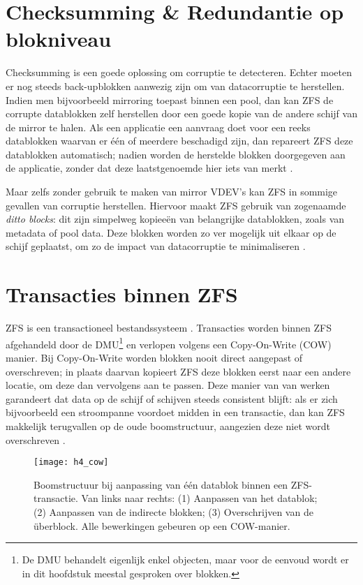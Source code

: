 \section{Checksumming \& Redundantie op blokniveau}

Checksumming is een goede oplossing om corruptie te detecteren. Echter moeten er nog steeds back-upblokken aanwezig zijn om van datacorruptie te herstellen. Indien men bijvoorbeeld mirroring toepast binnen een pool, dan kan ZFS de corrupte datablokken zelf herstellen door een goede kopie van de andere schijf van de mirror te halen. Als een applicatie een aanvraag doet voor een reeks datablokken waarvan er één of meerdere beschadigd zijn, dan repareert ZFS deze datablokken automatisch; nadien worden de herstelde blokken doorgegeven aan de applicatie, zonder dat deze laatstgenoemde hier iets van merkt \autocite{ZFSBonwick}.

Maar zelfs zonder gebruik te maken van mirror VDEV's kan ZFS in sommige gevallen van corruptie herstellen. Hiervoor maakt ZFS gebruik van zogenaamde \textit{ditto blocks}: dit zijn simpelweg kopieeën van belangrijke datablokken, zoals van metadata of pool data. Deze blokken worden zo ver mogelijk uit elkaar op de schijf geplaatst, om zo de impact van datacorruptie te minimaliseren \autocite{Lucas2015}. 

\section{Transacties binnen ZFS}

ZFS is een transactioneel bestandssysteem \autocite{ZFSBonwick}. Transacties worden binnen ZFS afgehandeld door de DMU\footnote{De DMU behandelt eigenlijk enkel objecten, maar voor de eenvoud wordt er in dit hoofdstuk meestal gesproken over blokken.} en verlopen volgens een Copy-On-Write (COW) manier. Bij Copy-On-Write worden blokken nooit direct aangepast of overschreven; in plaats daarvan kopieert ZFS deze blokken eerst naar een andere locatie, om deze dan vervolgens aan te passen. Deze manier van van werken garandeert dat data op de schijf of schijven steeds consistent blijft: als er zich bijvoorbeeld een stroompanne voordoet midden in een transactie, dan kan ZFS makkelijk terugvallen op de oude boomstructuur, aangezien deze niet wordt overschreven \autocite{Lucas2015}.

\begin{figure}
        \centering
        \texttt{[image: h4\_cow]}
        \caption{Boomstructuur bij aanpassing van één datablok binnen een ZFS-transactie. Van links naar rechts: (1) Aanpassen van het datablok; (2) Aanpassen van de indirecte blokken; (3) Overschrijven van de \"{u}berblock. Alle bewerkingen gebeuren op een COW-manier. \autocite{ZFSBonwick}}
        \label{fig:bonwick_cow_illustratie}
\end{figure}

